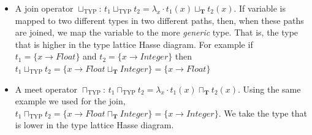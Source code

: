 \documentclass[10pt]{report}
\begin{document}
\begin{itemize}
\item A join operator $ \sqcup_{\mathrm{TYP}} $: $ t_{1} \sqcup_{\mathrm{TYP}} t_{2} = \lambda_{x}\cdot t_{1}(x) \sqcup_{\mathbf{T}} t_{2}(x) $. If variable is mapped to two different types in two different paths, then, when these paths are joined, we map the variable to the more \textit{generic} type. That is, the type that is higher in the type lattice Hasse diagram. For example if $ t_{1} = \lbrace x \rightarrow Float \rbrace $ and $ t_{2} = \lbrace x \rightarrow Integer \rbrace $ then $ t_{1} \sqcup _{\mathrm{TYP}} t_{2} = \lbrace x \rightarrow Float \sqcup_{\mathbf{T}} Integer \rbrace = \lbrace x \rightarrow Float \rbrace $

\item A meet operator $ \sqcap_{\mathrm{TYP}} $: $ t_{1} \sqcap_{\mathrm{TYP}} t_{2} = \lambda_{x}\cdot t_{1}(x) \sqcap_{\mathbf{T}} t_{2}(x) $. Using the same example we used for the join,  $t_{1} \sqcap _{\mathrm{TYP}} t_{2} = \lbrace x \rightarrow Float \sqcap_{\mathbf{T}} Integer \rbrace = \lbrace x \rightarrow Integer \rbrace $. We take the type that is lower in the type lattice Hasse diagram. 



\end{itemize}
\end{document}
